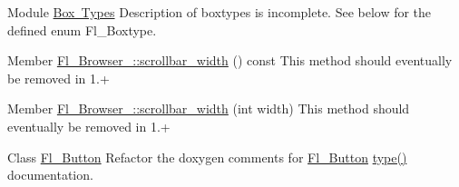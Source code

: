 
\begin{DoxyRefList}
\item[Module \mbox{\hyperlink{_enumerations_8_h_amgrp2126f69af9d5d7bac9ff67a532026acc}{Box Types}} ]\label{todo__todo000003}%
%
Description of boxtypes is incomplete. See below for the defined enum Fl\+\_\+\+Boxtype.  
\item[Member \mbox{\hyperlink{class_fl___browser___a397cd7d2550ca3d87032fa1ffd3e4bbc}{Fl\+\_\+\+Browser\+\_\+::scrollbar\+\_\+width}} () const]\label{todo__todo000006}%
%
This method should eventually be removed in 1.+  
\item[Member \mbox{\hyperlink{class_fl___browser___a4d59d5c7d78393a7a5d5bfaa01694580}{Fl\+\_\+\+Browser\+\_\+::scrollbar\+\_\+width}} (int width)]\label{todo__todo000007}%
%
This method should eventually be removed in 1.+  
\item[Class \mbox{\hyperlink{class_fl___button}{Fl\+\_\+\+Button}} ]\label{todo__todo000008}%
%
Refactor the doxygen comments for \mbox{\hyperlink{class_fl___button}{Fl\+\_\+\+Button}} \mbox{\hyperlink{class_fl___widget_adda2e8f162b3ea0332eb8d762350bbd5}{type()}} documentation.


\end{DoxyRefList}
